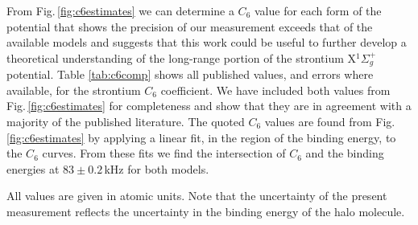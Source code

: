 From Fig.\,\ref{fig:c6estimates} we can determine a $C_6$ value for each form of the potential that shows the precision of our measurement exceeds that of the available models and suggests that this work could be useful to further develop a theoretical understanding of the long-range portion of the strontium X$^1\Sigma_g^+$ potential.
Table \ref{tab:c6comp} shows all published values, and errors where available, for the strontium $C_6$ coefficient.
We have included both values from Fig.\,\ref{fig:c6estimates} for completeness and show that they are in agreement with a majority of the published literature.
The quoted $C_6$ values are found from Fig.\,\ref{fig:c6estimates} by applying a linear fit, in the region of the binding energy, to the $C_6$ curves.
From these fits we find the intersection of $C_6$ and the binding energies at $83 \pm 0.2$\,kHz for both models.
	\begin{table}[]
	\centering
		\caption{Comparison of $C_6$ values from literature}{All values are given in atomic units. Note that the uncertainty of the present measurement reflects the uncertainty in the binding energy of the halo molecule.}
		\label{tab:c6comp}
	\end{table}


